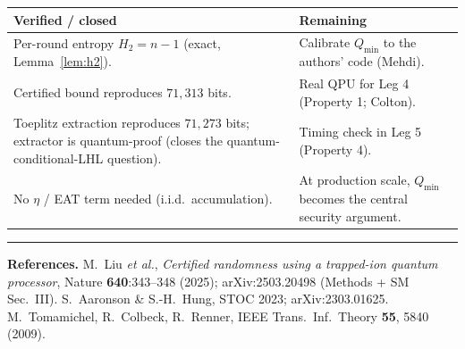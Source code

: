 \documentclass[11pt]{article}
\theoremstyle{definition}
\theoremstyle{plain}
\newcommand{\Qmin}{Q_{\min}}
\begin{document}
\begin{center}
\renewcommand{\arraystretch}{1.25}
\begin{tabular}{>{\raggedright}p{} p{}}
\toprule
\textbf{Verified / closed} & \textbf{Remaining} \\
\midrule
Per-round entropy $H_2=n-1$ (exact, Lemma~\ref{lem:h2}). & Calibrate $\Qmin$ to the authors' code (Mehdi). \\
Certified bound reproduces $71{,}313$ bits. & Real QPU for Leg 4 (Property 1; Colton). \\
Toeplitz extraction reproduces $71{,}273$ bits; extractor is quantum-proof (closes the quantum-conditional-LHL question). & Timing check in Leg 5 (Property 4). \\
No $\eta$ / EAT term needed (i.i.d.\ accumulation). & At production scale, $\Qmin$ becomes the central security argument. \\
\bottomrule
\end{tabular}
\end{center}

\vspace{0.5em}
\hrule
\vspace{0.5em}
\small
\noindent\textbf{References.}
M.\ Liu \emph{et al.}, \emph{Certified randomness using a trapped-ion quantum processor},
Nature \textbf{640}:343--348 (2025); arXiv:2503.20498 (Methods + SM Sec.~III).\quad
S.\ Aaronson \& S.-H.\ Hung, STOC 2023; arXiv:2303.01625.\quad
M.\ Tomamichel, R.\ Colbeck, R.\ Renner, IEEE Trans.\ Inf.\ Theory \textbf{55}, 5840 (2009).
\end{document}
